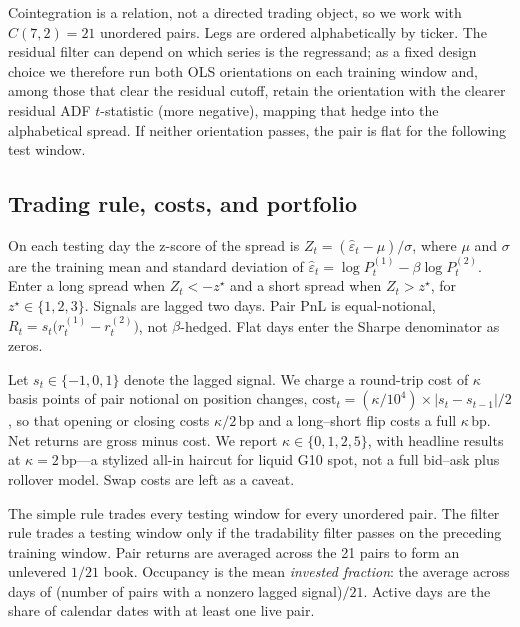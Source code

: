 \documentclass[11pt,a4paper]{article}
\begin{document}
Cointegration is a relation, not a directed trading object, so we work with
$C(7,2)=21$ unordered pairs. Legs are ordered alphabetically by ticker. The residual filter
can depend on which series is the regressand; as a fixed design choice we therefore run both
OLS orientations on each training window and, among those that clear the residual cutoff,
retain the orientation with the clearer residual ADF $t$-statistic (more negative), mapping
that hedge into the alphabetical spread. If neither orientation passes, the pair is flat for
the following test window.

\subsection{Trading rule, costs, and portfolio}

On each testing day the z-score of the spread is
$Z_t=(\hat\varepsilon_t-\mu)/\sigma$, where $\mu$ and $\sigma$ are the training mean and
standard deviation of $\hat\varepsilon_t=\log P^{(1)}_t-\beta\log P^{(2)}_t$. Enter a long
spread when $Z_t<-z^{\star}$ and a short spread when $Z_t>z^{\star}$, for
$z^{\star}\in\{1,2,3\}$. Signals are lagged two days. Pair PnL is equal-notional,
$R_t=s_t\bigl(r^{(1)}_t-r^{(2)}_t\bigr)$, not $\beta$-hedged. Flat days enter the Sharpe
denominator as zeros.

Let $s_t\in\{-1,0,1\}$ denote the lagged signal. We charge a round-trip cost of $\kappa$
basis points of pair notional on position changes,
$\mathrm{cost}_t=(\kappa/10^{4})\times|s_t-s_{t-1}|/2$, so that opening or closing costs
$\kappa/2$\,bp and a long--short flip costs a full $\kappa$\,bp. Net returns are gross minus
cost. We report $\kappa\in\{0,1,2,5\}$, with headline results at $\kappa=2$\,bp---a stylized
all-in haircut for liquid G10 spot, not a full bid--ask plus rollover model. Swap costs are
left as a caveat.

The simple rule trades every testing window for every unordered pair. The filter rule trades
a testing window only if the tradability filter passes on the preceding training window.
Pair returns are averaged across the 21 pairs to form an unlevered $1/21$ book. Occupancy is
the mean \emph{invested fraction}: the average across days of (number of pairs with a nonzero
lagged signal)$/21$. Active days are the share of calendar dates with at least one live pair.
\end{document}
